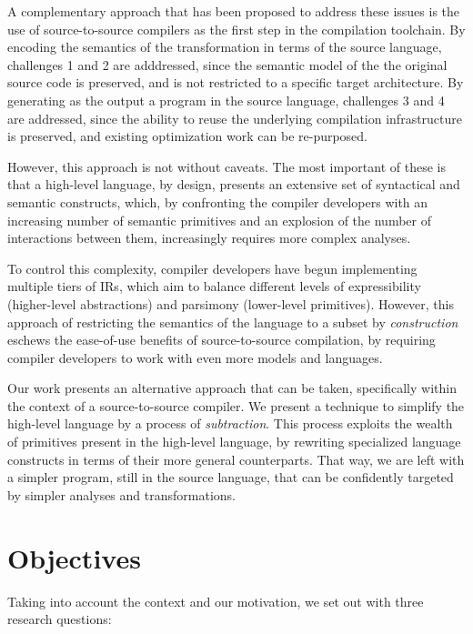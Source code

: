 A complementary approach that has been proposed to address these issues is the use of source-to-source compilers as the first step in the compilation toolchain. By encoding the semantics of the transformation in terms of the source language, challenges 1 and 2 are adddressed, since the semantic model of the the original source code is preserved, and is not restricted to a specific target architecture. By generating as the output a program in the source language, challenges 3 and 4 are addressed, since the ability to reuse the underlying compilation infrastructure is preserved, and existing optimization work can be re-purposed.

However, this approach is not without caveats. The most important of these is that a high-level language, by design, presents an extensive set of syntactical and semantic constructs, which, by confronting the compiler developers with an increasing number of semantic primitives and an explosion of the number of interactions between them, increasingly requires more complex analyses.

To control this complexity, compiler developers have begun implementing multiple tiers of IRs, which aim to balance different levels of expressibility (higher-level abstractions) and parsimony (lower-level primitives). However, this approach of restricting the semantics of the language to a subset by \textit{construction} eschews the ease-of-use benefits of source-to-source compilation, by requiring compiler developers to work with even more models and languages.

Our work presents an alternative approach that can be taken, specifically within the context of a source-to-source compiler. We present a technique to simplify the high-level language by a process of \textit{subtraction}. This process exploits the wealth of primitives present in the high-level language, by rewriting specialized language constructs in terms of their more general counterparts. That way, we are left with a simpler program, still in the source language, that can be confidently targeted by simpler analyses and transformations.

\section{Objectives} \label{sec:objectives}

Taking into account the context and our motivation, we set out with three research questions:

